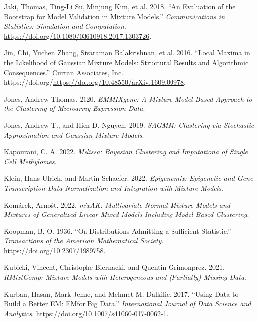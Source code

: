 \begin{CSLReferences}{1}{0}
\leavevmode{}%
Jaki, Thomas, Ting-Li Su, Minjung Kim, et al. 2018. {``An Evaluation of the Bootstrap for Model Validation in Mixture Models.''} \emph{Communications in Statistics: Simulation and Computation}. \url{https://doi.org/10.1080/03610918.2017.1303726}.

\leavevmode{}%
Jin, Chi, Yuchen Zhang, Sivaraman Balakrishnan, et al. 2016. {``Local {Maxima} in the {Likelihood} of {Gaussian Mixture Models}: {Structural Results} and {Algorithmic Consequences}.''} Curran Associates, Inc. https://doi.org/\url{https://doi.org/10.48550/arXiv.1609.00978}.

\leavevmode{}%
Jones, Andrew Thomas. 2020. \emph{EMMIXgene: A Mixture Model-Based Approach to the Clustering of Microarray Expression Data}.

\leavevmode{}%
Jones, Andrew T., and Hien D. Nguyen. 2019. \emph{SAGMM: Clustering via Stochastic Approximation and Gaussian Mixture Models}.

\leavevmode{}%
Kapourani, C. A. 2022. \emph{Melissa: Bayesian Clustering and Imputationa of Single Cell Methylomes}.

\leavevmode{}%
Klein, Hans-Ulrich, and Martin Schaefer. 2022. \emph{Epigenomix: Epigenetic and Gene Transcription Data Normalization and Integration with Mixture Models}.

\leavevmode{}%
Komárek, Arnošt. 2022. \emph{mixAK: Multivariate Normal Mixture Models and Mixtures of Generalized Linear Mixed Models Including Model Based Clustering}.

\leavevmode{}%
Koopman, B. O. 1936. {``On {Distributions Admitting} a {Sufficient Statistic}.''} \emph{Transactions of the American Mathematical Society}. \url{https://doi.org/10.2307/1989758}.

\leavevmode{}%
Kubicki, Vincent, Christophe Biernacki, and Quentin Grimonprez. 2021. \emph{RMixtComp: Mixture Models with Heterogeneous and (Partially) Missing Data}.

\leavevmode{}%
Kurban, Hasan, Mark Jenne, and Mehmet M. Dalkilic. 2017. {``Using Data to Build a Better {EM}: {EM}\textasteriskcentered for Big Data.''} \emph{International Journal of Data Science and Analytics}. \url{https://doi.org/10.1007/s41060-017-0062-1}.


\end{CSLReferences}
